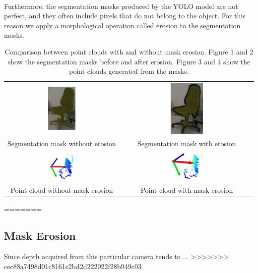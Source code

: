 \hfill
\\Furthermore, the segmentation masks produced by the YOLO model are not perfect, and they often include pixels that do not belong to the object.
For this reason we apply a morphological operation called erosion to the segmentation masks.

\begin{table}[htbp]
    \centering
    \begin{tabular}{cc}
        \includegraphics[width=0.25\textwidth]{figs/mask_no_erosion.png} & \includegraphics[width=0.25\textwidth]{figs/mask_erosion.png} \\
        \small Segmentation mask without erosion & \small Segmentation mask with erosion \\
        \includegraphics[width=0.25\textwidth]{figs/pc_no_erosion.png} & \includegraphics[width=0.25\textwidth]{figs/pc_erosion.png} \\
        \small Point cloud without mask erosion & \small Point cloud with mask erosion \\
    \end{tabular}
    \caption{Comparison between point clouds with and without mask erosion. Figure 1 and 2 show the segmentation masks before and after erosion. Figure 3 and 4 show the point clouds generated from the masks.}
    \label{fig:erosion_comparison}
\end{table}


=======
\subsection[Mask Erosion]{Mask Erosion}
Since depth acquired from this particular camera tends to ...
>>>>>>> cec88a7498d01c8161e2bd2d222022f28b949c03

